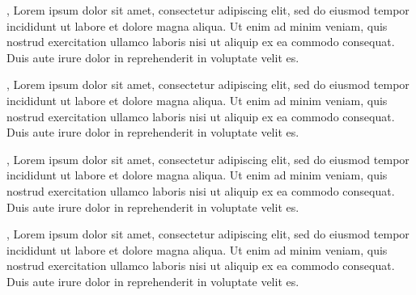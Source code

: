 
\par
{},\cite{pbsnewshour}
Lorem ipsum dolor sit amet, consectetur adipiscing elit, sed do 
eiusmod tempor incididunt ut labore et dolore magna aliqua. Ut enim 
ad minim veniam, quis nostrud exercitation ullamco laboris nisi 
ut aliquip ex ea commodo consequat. Duis aute irure dolor in 
reprehenderit in voluptate velit es.

\par
{},\cite{youtube}
Lorem ipsum dolor sit amet, consectetur adipiscing elit, sed do 
eiusmod tempor incididunt ut labore et dolore magna aliqua. Ut enim 
ad minim veniam, quis nostrud exercitation ullamco laboris nisi 
ut aliquip ex ea commodo consequat. Duis aute irure dolor in 
reprehenderit in voluptate velit es.

\par
{},\cite{firstprogrammer}
Lorem ipsum dolor sit amet, consectetur adipiscing elit, sed do 
eiusmod tempor incididunt ut labore et dolore magna aliqua. Ut enim 
ad minim veniam, quis nostrud exercitation ullamco laboris nisi 
ut aliquip ex ea commodo consequat. Duis aute irure dolor in 
reprehenderit in voluptate velit es.

\par
{},\cite{pbsnewshour}
Lorem ipsum dolor sit amet, consectetur adipiscing elit, sed do 
eiusmod tempor incididunt ut labore et dolore magna aliqua. Ut enim 
ad minim veniam, quis nostrud exercitation ullamco laboris nisi 
ut aliquip ex ea commodo consequat. Duis aute irure dolor in 
reprehenderit in voluptate velit es.

\clearpage